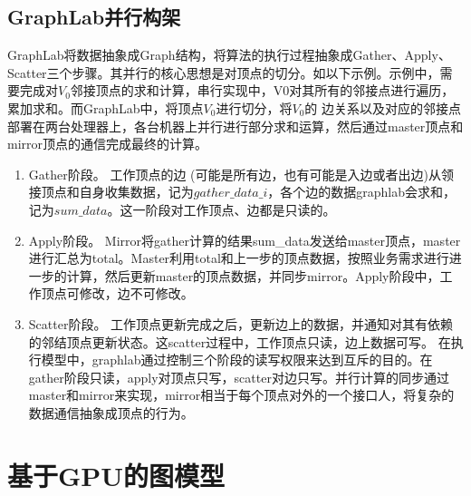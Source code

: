 \subsection{GraphLab并行构架}
GraphLab将数据抽象成Graph结构，将算法的执行过程抽象成Gather、Apply、Scatter三个步骤。其并行的核心思想是对顶点的切分。如以下示例。示例中，需要完成对$V_0$邻接顶点的求和计算，串行实现中，V0对其所有的邻接点进行遍历，累加求和。而GraphLab中，将顶点$V_0$进行切分，将$V_0$的 边关系以及对应的邻接点部署在两台处理器上，各台机器上并行进行部分求和运算，然后通过master顶点和mirror顶点的通信完成最终的计算。
\begin{enumerate}
\item Gather阶段。
   工作顶点的边 (可能是所有边，也有可能是入边或者出边)从领接顶点和自身收集数据，记为$gather\_data\_i$，各个边的数据graphlab会求和，记为$sum\_data$。这一阶段对工作顶点、边都是只读的。
\item Apply阶段。
Mirror将gather计算的结果sum_data发送给master顶点，master进行汇总为total。Master利用total和上一步的顶点数据，按照业务需求进行进一步的计算，然后更新master的顶点数据，并同步mirror。Apply阶段中，工作顶点可修改，边不可修改。
\item  Scatter阶段。
工作顶点更新完成之后，更新边上的数据，并通知对其有依赖的邻结顶点更新状态。这scatter过程中，工作顶点只读，边上数据可写。
在执行模型中，graphlab通过控制三个阶段的读写权限来达到互斥的目的。在gather阶段只读，apply对顶点只写，scatter对边只写。并行计算的同步通过master和mirror来实现，mirror相当于每个顶点对外的一个接口人，将复杂的数据通信抽象成顶点的行为。

\end{enumerate}


\section{基于GPU的图模型}
